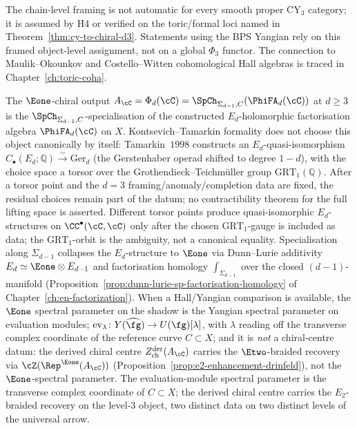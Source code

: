 The chain-level framing is not automatic for every smooth proper CY$_3$ category; it is assumed by H4 or verified on the toric/formal loci named in Theorem~\ref{thm:cy-to-chiral-d3}. Statements using the BPS Yangian rely on this framed object-level assignment, not on a global $\Phi_3$ functor. The connection to Maulik--Okounkov and Costello--Witten cohomological Hall algebras is traced in Chapter~\ref{ch:toric-coha}.

\begin{remark}
\label{rem:kt-formality-e1-braiding-source}
The $\Eone$-chiral output $A_\cC = \Phi_d(\cC) = \SpCh_{\Sigma_{d-1}, C}(\PhiFA_d(\cC))$ at $d \geq 3$ is the $\SpCh_{\Sigma_{d-1}, C}$-specialisation of the constructed $E_d$-holomorphic factorisation algebra $\PhiFA_d(\cC)$ on $X$. Kontsevich--Tamarkin formality does not choose this object canonically by itself: Tamarkin~$1998$ constructs an $E_d$-quasi-isomorphism $C_\bullet(E_d; \mathbb{Q}) \xrightarrow{\sim} \mathrm{Ger}_d$ (the Gerstenhaber operad shifted to degree $1 - d$), with the choice space a torsor over the Grothendieck--Teichm\"uller group $\mathrm{GRT}_1(\mathbb{Q})$. After a torsor point and the $d=3$ framing/anomaly/completion data are fixed, the residual choices remain part of the datum; no contractibility theorem for the full lifting space is asserted. Different torsor points produce quasi-isomorphic $E_d$-structures on $\CC^\bullet(\cC, \cC)$ only after the chosen $\mathrm{GRT}_1$-gauge is included as data; the $\mathrm{GRT}_1$-orbit is the ambiguity, not a canonical equality. Specialisation along $\Sigma_{d-1}$ collapses the $E_d$-structure to $\Eone$ via Dunn--Lurie additivity $E_d \simeq \Eone \otimes E_{d-1}$ and factorisation homology $\int_{\Sigma_{d-1}}$ over the closed $(d{-}1)$-manifold (Proposition~\ref{prop:dunn-lurie-sp-factorisation-homology} of Chapter~\ref{ch:en-factorization}). When a Hall/Yangian comparison is available, the $\Eone$ spectral parameter on the shadow is the Yangian spectral parameter on evaluation modules; $\mathrm{ev}_\lambda \colon Y(\widehat{\fg}) \to U(\fg)[\lambda]$, with $\lambda$ reading off the transverse complex coordinate of the reference curve $C \subset X$; and it is \emph{not} a chiral-centre datum: the derived chiral centre $Z^{\mathrm{der}}_{\mathrm{ch}}(A_\cC)$ carries the $\Etwo$-braided recovery via $\cZ(\Rep^{\Eone}(A_\cC))$ (Proposition~\ref{prop:e2-enhancement-drinfeld}), not the $\Eone$-spectral parameter. The evaluation-module spectral parameter is the transverse complex coordinate of $C \subset X$; the derived chiral centre carries the $E_2$-braided recovery on the level-$3$ object, two distinct data on two distinct levels of the universal arrow.
\end{remark}

